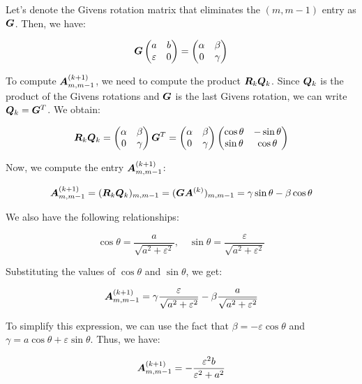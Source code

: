 \documentclass[twoside,10pt]{article}
\begin{document}
\quad Let's denote the Givens rotation matrix that eliminates the $(m, m-1)$ entry as $\bm{G}$. Then, we have:

$$\bm{G}\begin{pmatrix}
  a & b \\
  \varepsilon & 0
\end{pmatrix} = \begin{pmatrix}
  \alpha & \beta \\
  0 & \gamma
\end{pmatrix}$$

To compute $\bm{A}_{m, m-1}^{(k + 1)}$, we need to compute the product $\bm{R}_k \bm{Q}_k$. Since $\bm{Q}_k$ is the product of the Givens rotations and $\bm{G}$ is the last Givens rotation, we can write $\bm{Q}_k = \bm{G}^T$. We obtain:

$$\bm{R}_k \bm{Q}_k = \begin{pmatrix}
  \alpha & \beta \\
  0 & \gamma
\end{pmatrix} \bm{G}^T = \begin{pmatrix}
  \alpha & \beta \\
  0 & \gamma
\end{pmatrix} \begin{pmatrix}
  \cos \theta & -\sin \theta \\
  \sin \theta & \cos \theta
\end{pmatrix}$$

Now, we compute the entry $\bm{A}_{m, m-1}^{(k + 1)}$:

$$\bm{A}_{m, m-1}^{(k + 1)} = (\bm{R}_k \bm{Q}_k)_{m, m-1} = (\bm{G}\bm{A}^{(k)})_{m, m-1} = \gamma \sin \theta - \beta \cos \theta$$

We also have the following relationships:

$$\cos \theta = \frac{a}{\sqrt{a^2 + \varepsilon^2}}, \quad \sin \theta = \frac{\varepsilon}{\sqrt{a^2 + \varepsilon^2}}$$

Substituting the values of $\cos \theta$ and $\sin \theta$, we get:

$$\bm{A}_{m, m-1}^{(k + 1)} = \gamma \frac{\varepsilon}{\sqrt{a^2 + \varepsilon^2}} - \beta \frac{a}{\sqrt{a^2 + \varepsilon^2}}$$

To simplify this expression, we can use the fact that $\beta = -\varepsilon \cos \theta$ and $\gamma = a \cos \theta + \varepsilon \sin \theta$. Thus, we have:

$$\bm{A}_{m, m-1}^{(k + 1)} = - \frac{\varepsilon^2 b}{\varepsilon^2 + a^2}$$
\end{document}
